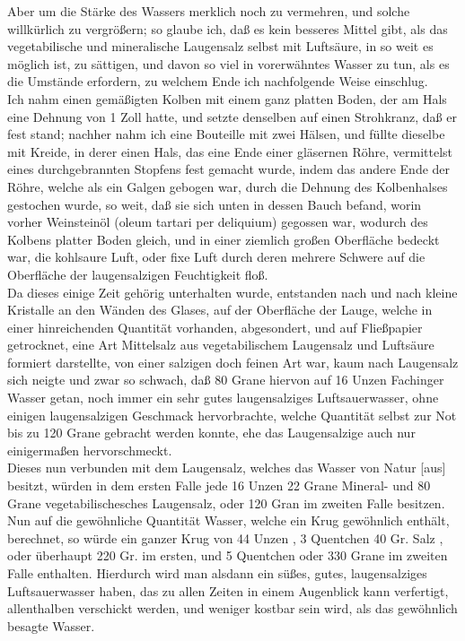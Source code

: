 \documentclass[fontsize=11pt,a5paper,twoside]{memoir}
\begin{document}
Aber um die Stärke des Wassers merklich noch zu vermehren,
und solche willkürlich zu vergrößern;
so glaube ich, daß es kein besseres Mittel gibt,
als das vegetabilische und mineralische Laugensalz selbst mit Luftsäure,
in so weit es möglich ist, zu sättigen,
und davon so viel in vorerwähntes Wasser zu tun,
als es die Umstände erfordern,
zu welchem Ende ich nachfolgende Weise einschlug.\\

Ich nahm einen gemäßigten Kolben mit einem ganz platten Boden,
der am Hals eine Dehnung von 1 Zoll hatte,
und setzte denselben auf einen Strohkranz,
daß er fest stand;
nachher nahm ich eine Bouteille mit zwei Hälsen,
und füllte dieselbe mit Kreide,
in derer einen Hals, das eine Ende einer gläsernen Röhre,
vermittelst eines durchgebrannten Stopfens fest gemacht wurde,
indem das andere Ende der Röhre,
welche als ein Galgen gebogen war,
durch die Dehnung des Kolbenhalses gestochen wurde,
so weit, daß sie sich unten in dessen Bauch befand,
worin vorher Weinsteinöl%
({\lattext oleum tartari per deliquium})
gegossen war,
wodurch des Kolbens platter Boden gleich,
und in einer ziemlich großen Oberfläche bedeckt war,
die kohlsaure Luft, oder fixe Luft
durch deren mehrere Schwere auf die Oberfläche
der laugensalzigen Feuchtigkeit floß.\\

Da dieses einige Zeit gehörig unterhalten wurde,
entstanden nach und nach kleine Kristalle an den Wänden des Glases,
auf der Oberfläche der Lauge,
welche in einer hinreichenden Quantität vorhanden,
abgesondert, und auf Fließpapier getrocknet,
eine Art Mittelsalz aus vegetabilischem Laugensalz
und Luftsäure formiert darstellte,
von einer salzigen doch feinen Art war,
kaum nach Laugensalz sich neigte%
und zwar so schwach,
daß 80 Grane hiervon auf 16 Unzen Fachinger Wasser getan,
noch immer ein sehr gutes laugensalziges Luftsauerwasser,
ohne einigen laugensalzigen Geschmack hervorbrachte,
welche Quantität selbst zur Not bis zu 120 Grane gebracht werden konnte,
ehe das Laugensalzige auch nur einigermaßen hervorschmeckt.\\

Dieses nun verbunden mit dem Laugensalz,
welches das Wasser von Natur [aus] besitzt,
würden in dem ersten Falle jede 16 Unzen
22 Grane Mineral-
und 80 Grane vegetabilischesches Laugensalz,
oder 120 Gran im zweiten Falle besitzen.
Nun auf die gewöhnliche Quantität Wasser,
welche ein Krug gewöhnlich enthält, berechnet,
so würde ein ganzer Krug von 44 Unzen%
,
3 Quentchen 40 Gr. Salz%
,
oder überhaupt 220 Gr. im ersten,
und 5 Quentchen
oder 330 Grane im zweiten Falle enthalten.
\label{units_value_page}
Hierdurch wird man alsdann ein süßes, gutes,
laugensalziges Luftsauerwasser haben,
das zu allen Zeiten in einem Augenblick kann verfertigt,
allenthalben verschickt werden,
und weniger kostbar sein wird,
als das gewöhnlich besagte Wasser.\\
\end{document}
